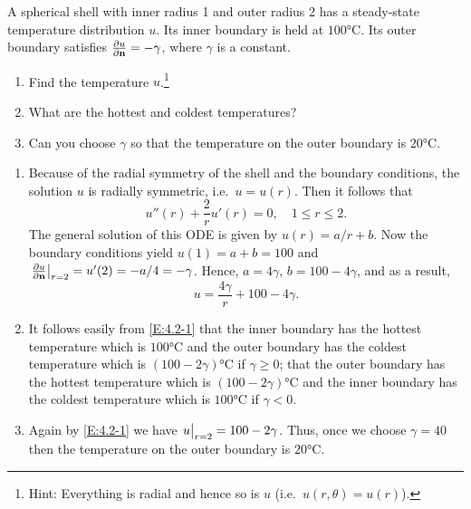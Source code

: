 \begin{question}{4.2}{}
    A spherical shell with inner radius 1 and outer radius 2 has a steady-state temperature distribution $u$. Its inner boundary is held at $100$\si{\degreeCelsius}. Its outer boundary satisfies $\pdv{u}{\vb{n}}=-\gamma$, where $\gamma$ is a constant.
    \begin{enumerate}[label=(\alph*)]
        \item Find the temperature $u$.\footnote{Hint: Everything is radial and hence so is $u$ (i.e.\ $u(r, \theta) = u(r)$).}
        \item What are the hottest and coldest temperatures?
        \item Can you choose $\gamma$ so that the temperature on the outer boundary is $20$\si{\degreeCelsius}.
    \end{enumerate}
\end{question}
\begin{enumerate}[label=(\alph*)]
    \item Because of the radial symmetry of the shell and the boundary conditions, the solution $u$ is radially symmetric, i.e.\ $u=u(r)$. Then it follows that
        \[
            u''(r) + \frac{2}{r}u'(r) = 0, \quad 1\leq r\leq 2.
        \]
        The general solution of this ODE is given by $u(r)=a/r+b$. Now the boundary conditions yield $u(1)=a+b=100$ and $\eval{\pdv{u}{\vb{n}}}_{r=2}=u'(2)=-a/4=-\gamma$. Hence, $a=4\gamma$, $b=100-4\gamma$, and as a result,
        \begin{equation}\label{E:4.2-1}
            u = \frac{4\gamma}{r} + 100 - 4\gamma.
        \end{equation}
    \item It follows easily from \eqref{E:4.2-1} that the inner boundary has the hottest temperature which is $100$\si{\degreeCelsius} and the outer boundary has the coldest temperature which is $(100-2\gamma)$\si{\degreeCelsius} if $\gamma\geq 0$; that the outer boundary has the hottest temperature which is $(100-2\gamma)$\si{\degreeCelsius} and the inner boundary has the coldest temperature which is $100$\si{\degreeCelsius} if $\gamma<0$.
    \item Again by \eqref{E:4.2-1} we have $\eval{u}_{r=2}=100-2\gamma$. Thus, once we choose $\gamma=40$ then the temperature on the outer boundary is $20$\si{\degreeCelsius}.
\end{enumerate}


